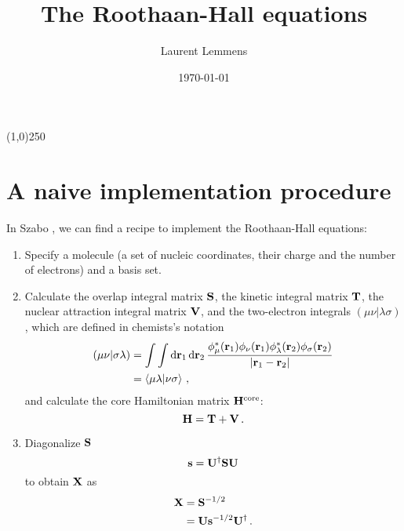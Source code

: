 \documentclass[12pt]{article}
\title{The Roothaan-Hall equations}
\author{Laurent Lemmens}
\date{\today \hspace{6pt} \currenttime}
\begin{document}
\maketitle

\begin{center}
\line(1,0){250}
\end{center}

\tableofcontents
\newpage


\section{A naive implementation procedure}
    In Szabo \cite{szabo}, we can find a recipe to implement the Roothaan-Hall equations:
    \begin{enumerate}
        \item Specify a molecule (a set of nucleic coordinates, their charge and the number of electrons) and a basis set.

        \item Calculate the overlap integral matrix $\vb{S}$, the kinetic integral matrix $\vb{T}$, the nuclear attraction integral matrix $\vb{V}$, and the two-electron integrals $(\mu \nu|\lambda \sigma)$, which are defined in chemists's notation
        \begin{align}
            (\mu \nu|\sigma \lambda) &= \int \int \dd{\vb{r}_1} \dd{\vb{r}_2} \frac{\phi_\mu^*(\vb{r}_1) \phi_\nu(\vb{r}_1) \phi_\lambda^*(\vb{r}_2) \phi_\sigma(\vb{r}_2)}{|\vb{r}_1 - \vb{r}_2|} \\
            &= \braket{\mu \lambda}{\nu \sigma} \thinspace ,
        \end{align}
        and calculate the core Hamiltonian matrix $\vb{H}^\text{core}$:
        \begin{equation}
            \vb{H} = \vb{T} + \vb{V} \thinspace .
        \end{equation}

        \item Diagonalize $\vb{S}$
        \begin{equation}
            \vb{s} = \vb{U}^\dagger \vb{S} \vb{U}
        \end{equation}
        to obtain $\vb{X}$ as
        \begin{align}
            \vb{X} &= \vb{S}^{-1/2} \\
            &= \vb{U} \vb{s}^{-1/2} \vb{U}^\dagger \thinspace .
        \end{align}


\end{enumerate}
\end{document}
